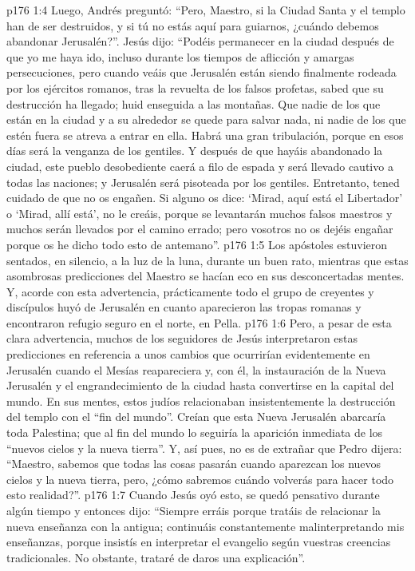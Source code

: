 \vs p176 1:4 Luego, Andrés preguntó: “Pero, Maestro, si la Ciudad Santa y el templo han de ser destruidos, y si tú no estás aquí para guiarnos, ¿cuándo debemos abandonar Jerusalén?”. Jesús dijo: “Podéis permanecer en la ciudad después de que yo me haya ido, incluso durante los tiempos de aflicción y amargas persecuciones, pero cuando veáis que Jerusalén están siendo finalmente rodeada por los ejércitos romanos, tras la revuelta de los falsos profetas, sabed que su destrucción ha llegado; huid enseguida a las montañas. Que nadie de los que están en la ciudad y a su alrededor se quede para salvar nada, ni nadie de los que estén fuera se atreva a entrar en ella. Habrá una gran tribulación, porque en esos días será la venganza de los gentiles. Y después de que hayáis abandonado la ciudad, este pueblo desobediente caerá a filo de espada y será llevado cautivo a todas las naciones; y Jerusalén será pisoteada por los gentiles. Entretanto, tened cuidado de que no os engañen. Si alguno os dice: ‘Mirad, aquí está el Libertador’ o ‘Mirad, allí está’, no le creáis, porque se levantarán muchos falsos maestros y muchos serán llevados por el camino errado; pero vosotros no os dejéis engañar porque os he dicho todo esto de antemano”.
\vs p176 1:5 Los apóstoles estuvieron sentados, en silencio, a la luz de la luna, durante un buen rato, mientras que estas asombrosas predicciones del Maestro se hacían eco en sus desconcertadas mentes. Y, acorde con esta advertencia, prácticamente todo el grupo de creyentes y discípulos huyó de Jerusalén en cuanto aparecieron las tropas romanas y encontraron refugio seguro en el norte, en Pella.
\vs p176 1:6 Pero, a pesar de esta clara advertencia, muchos de los seguidores de Jesús interpretaron estas predicciones en referencia a unos cambios que ocurrirían evidentemente en Jerusalén cuando el Mesías reapareciera y, con él, la instauración de la Nueva Jerusalén y el engrandecimiento de la ciudad hasta convertirse en la capital del mundo. En sus mentes, estos judíos relacionaban insistentemente la destrucción del templo con el “fin del mundo”. Creían que esta Nueva Jerusalén abarcaría toda Palestina; que al fin del mundo lo seguiría la aparición inmediata de los “nuevos cielos y la nueva tierra”. Y, así pues, no es de extrañar que Pedro dijera: “Maestro, sabemos que todas las cosas pasarán cuando aparezcan los nuevos cielos y la nueva tierra, pero, ¿cómo sabremos cuándo volverás para hacer todo esto realidad?”.
\vs p176 1:7 Cuando Jesús oyó esto, se quedó pensativo durante algún tiempo y entonces dijo: “Siempre erráis porque tratáis de relacionar la nueva enseñanza con la antigua; continuáis constantemente malinterpretando mis enseñanzas, porque insistís en interpretar el evangelio según vuestras creencias tradicionales. No obstante, trataré de daros una explicación”.
